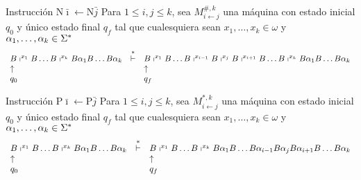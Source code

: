\begin{frame}
  \begin{block}{Instrucción $\mathrm{N}\bar{\imath} \leftarrow \mathrm{N}\bar{j}$}
    \PN Para $1 \leq i,j \leq k$, sea $M_{i \leftarrow j}^{\#,k}$ una máquina con estado inicial $q_{0}$ y único estado
    final $q_{f}$ tal que cualesquiera sean $x_{1}, \dotsc, x_{k} \in \omega$ y $\alpha_{1}, \dotsc, \alpha_{k} \in
    \Sigma^{\ast}$
    \minLetter
    \[
      \begin{array}{lcl}
        B \shortmid^{x_{1}} B \dotsc B \shortmid^{x_{k}} B \alpha_{1} B \dotsc B \alpha_{k} &\overset{\ast}{\vdash}& B
          \shortmid^{x_{1}} B \dotsc B \shortmid^{x_{i-1}} B \shortmid^{x_{j}} B \shortmid^{x_{i+1}} B \dotsc B
          \shortmid^{x_{k}} B \alpha_{1} B \dotsc B \alpha_{k} \\
        \uparrow && \uparrow \\
        q_{0} & & q_{f}
      \end{array}
    \]
  \end{block}

  \begin{block}{Instrucción $\mathrm{P}\bar{\imath} \leftarrow \mathrm{P}\bar{j}$}
    \PN Para $1 \leq i,j \leq k$, sea $M_{i \leftarrow j}^{\ast,k}$ una máquina con estado inicial $q_{0}$ y único
    estado final $q_{f}$ tal que cualesquiera sean $x_{1}, \dotsc, x_{k} \in \omega$ y $\alpha_{1}, \dotsc, \alpha_{k}
    \in \Sigma^{\ast}$
    \minLetter
    \[
      \begin{array}{lcl}
        B \shortmid^{x_{1}} B \dotsc B \shortmid^{x_{k}} B \alpha_{1} B \dotsc B \alpha_{k} &\overset{\ast}{\vdash}& B
          \shortmid^{x_{1}} B \dotsc B \shortmid^{x_{k}} B \alpha_{1} B \dotsc B \alpha_{i-1} B \alpha_{j} B
          \alpha_{i+1} B \dotsc B \alpha_{k} \\
        \uparrow && \uparrow \\
        q_{0} & & q_{f}
      \end{array}
    \]
  \end{block}
\end{frame}
